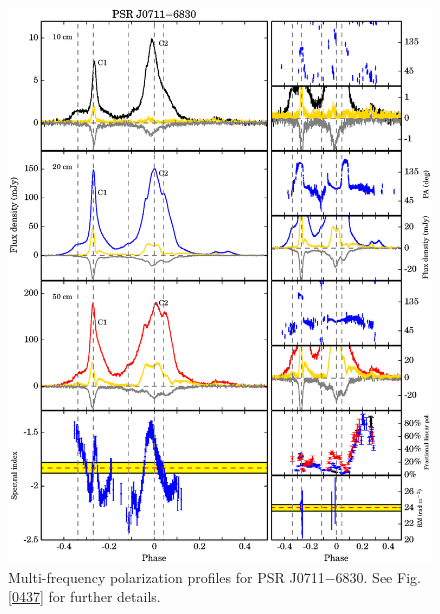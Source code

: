 \documentclass[useAMS,usenatbib]{mn2e}
\begin{document}
\begin{appendix}
\begin{figure}
\begin{center}
\includegraphics[width=6 in]{0711.ps}
\caption{Multi-frequency polarization profiles for PSR J0711$-$6830. 
See Fig. \ref{0437} for further details.}
\label{0711}
\end{center}
\end{figure}


\end{appendix}
\end{document}
